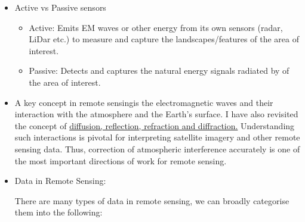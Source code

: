 \documentclass[
  letterpaper,
  DIV=11,
  numbers=noendperiod]{scrreprt}
\providecommand{\tightlist}{%
  \setlength{\itemsep}{0pt}\setlength{\parskip}{0pt}}\usepackage{longtable,booktabs,array}
\begin{document}
\begin{itemize}
\item
  Active vs Passive sensors

  \begin{itemize}
  \tightlist
  \item
    Active: Emits EM waves or other energy from its own sensors (radar,
    LiDar etc.) to measure and capture the landscapes/features of the
    area of interest.
  \item
    Passive: Detects and captures the natural energy signals radiated by
    of the area of interest.
  \end{itemize}
\item
  A key concept in remote sensingis the electromagnetic waves and their
  interaction with the atmosphere and the Earth's surface. I have also
  revisited the concept of
  \href{https://www.encyclopedie-environnement.org/en/zoom/diffusion-reflection-refraction-and-diffraction-of-light/}{diffusion,
  reflection, refraction and diffraction.} Understanding such
  interactions is pivotal for interpreting satellite imagery and other
  remote sensing data. Thus, correction of atmospheric interference
  accurately is one of the most important directions of work for remote
  sensing.
\item
  Data in Remote Sensing:

  There are many types of data in remote sensing, we can broadly
  categorise them into the following:


\end{itemize}
\end{document}
